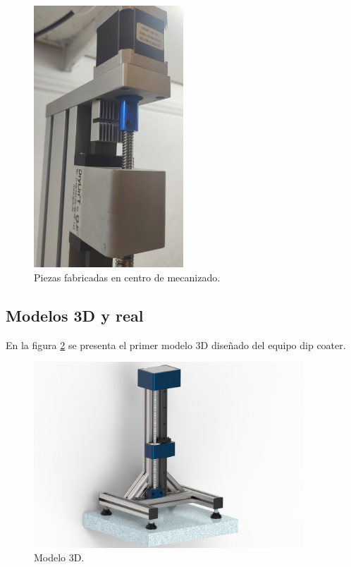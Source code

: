\begin{figure}[h]
	\centering
	\includegraphics[width=0.5\textwidth]{./Figures/real_custom.png}
	\caption{Piezas fabricadas en centro de mecanizado.}
	\label{fig:real_custom}
\end{figure}


\subsection{Modelos 3D y real}

En la figura \ref{fig:mecanica_3d_model} se presenta el primer modelo 3D diseñado del equipo dip coater.
\begin{figure}[h]
	\centering
	\includegraphics[width=0.9\textwidth]{./Figures/3d.jpg}
	\caption{Modelo 3D.}
	\label{fig:mecanica_3d_model}
\end{figure}


